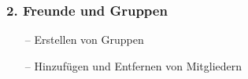 \documentclass[aspectratio=1610]{beamer}
\begin{document}
	\begin{frame}[plain]
	\frametitle{2. Freunde und Gruppen}
		\begin{minipage}{0.5\textwidth}
			\setlength{\fboxsep}{0pt}%
			\setlength{\fboxrule}{1pt}%
			\captionsetup{labelformat=empty}
			\centering
		\end{minipage}%
		\begin{minipage}{0.5\textwidth}
			\begin{itemize}
				\setlength\itemsep{0.3em}
				\item[--] Erstellen von Gruppen
				\item[--] Hinzufügen und Entfernen von Mitgliedern
			\end{itemize}
		\end{minipage}%
	\end{frame}
\end{document}
